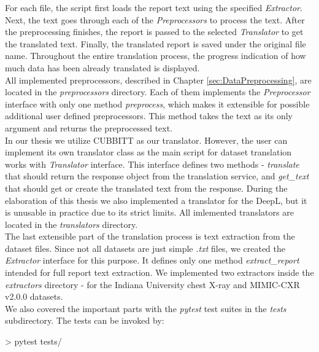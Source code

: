 For each file, the script first loads the report text using the specified \textit{Extractor}. Next, the text goes through each of the \textit{Preprocessors} to process the text. After the preprocessing finishes, the report is passed to the selected \textit{Translator} to get the translated text. Finally, the translated report is saved under the original file name. Throughout the entire translation process, the progress indication of how much data has been already translated is displayed.\\

All implemented preprocessors, described in Chapter \ref{sec:DataPreprocessing}, are located in the \textit{preprocessors} directory. Each of them implements the  \textit{Preprocessor} interface with only one method \textit{preprocess}, which makes it extensible for possible additional user defined preprocessors. This method takes the text as its only argument and returns the preprocessed text.\\

In our thesis we utilize CUBBITT as our translator. However, the user can implement its own translator class as the main script for dataset translation works with \textit{Translator} interface. This interface defines two methods - \textit{translate} that should return the response object from the translation service, and \textit{get\_text} that should get or create the translated text from the response. During the elaboration of this thesis we also implemented a translator for the DeepL, but it is unusable in practice due to its strict limits. All imlemented translators are located in the \textit{translators} directory.\\

The last extensible part of the translation process is text extraction from the dataset files. Since not all datasets are just simple \textit{.txt} files, we created the \textit{Extractor} interface for this purpose. It defines only one method \textit{extract\_report} intended for full report text extraction. We implemented two extractors inside the \textit{extractors} directory - for the Indiana University chest X-ray and MIMIC-CXR v2.0.0 datasets.\\

We also covered the important parts with the \textit{pytest} test suites in the \textit{tests} subdirectory. The tests can be invoked by:
\begin{code}
> pytest tests/
\end{code}

